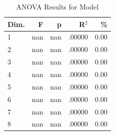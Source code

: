 \begin{table}[H]
  \centering
  \caption{ANOVA Results for Model}
  \label{tab:anova_model}
  \begin{tabular}{l r r r r}
    Dim. & F & p & R$^2$ & \% \\
    \hline
    1 & nan & nan & .00000 & 0.00 \\
    2 & nan & nan & .00000 & 0.00 \\
    3 & nan & nan & .00000 & 0.00 \\
    4 & nan & nan & .00000 & 0.00 \\
    5 & nan & nan & .00000 & 0.00 \\
    6 & nan & nan & .00000 & 0.00 \\
    7 & nan & nan & .00000 & 0.00 \\
    8 & nan & nan & .00000 & 0.00 \\
  \end{tabular}
\end{table}
